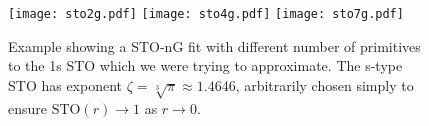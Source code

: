 \documentclass[../../master.tex]{subfiles}
\begin{document}
\begin{figure}
\centering
\texttt{[image: sto2g.pdf]}
\texttt{[image: sto4g.pdf]}
\texttt{[image: sto7g.pdf]}
\caption{Example showing a STO-nG fit with different number of primitives to the 1s STO which we were trying to approximate. The s-type STO has exponent $\zeta=\sqrt[3]{\pi}\approx1.4646$, arbitrarily chosen simply to ensure $\text{STO}(r)\rightarrow1$ as $r\rightarrow0$. \label{fig:sto24g}}
\end{figure}
\end{document}

